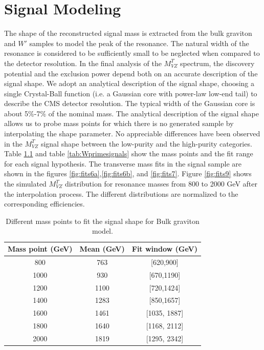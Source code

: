 \chapter{Signal Modeling}\label{sig_model}

The shape of the reconstructed signal mass is extracted from the bulk graviton and $W'$ samples to model the peak of the resonance. The natural width of the resonance is considered to be  sufficiently small to be neglected when compared to the detector resolution. In the final analysis of the $M_{VZ}^{T}$ spectrum, the discovery potential and the exclusion power depend both on an accurate description of the signal shape. We adopt an analytical description of the signal shape, choosing a single Crystal-Ball function (i.e. a Gaussian
core with power-law low-end tail) to describe the CMS detector resolution. The typical
width of the Gaussian core is about 5$\%$-7$\%$ of the nominal mass. The analytical description
of the signal shape allows us to probe mass points for which there is no generated sample by
interpolating the shape parameter. No appreciable differences have been observed
in the $M_{VZ}^{T}$ signal shape between the low-purity and the high-purity categories.
Table \ref{tab:Bulksignal} and table \ref{tab:Wprimesignals} show the mass points and the fit range for each signal hypothesis. The transverse mass fits in the signal sample are shown in the figures \ref{fig:fits6a},\ref{fig:fits6b}, and \ref{fig:fits7}. Figure \ref{fig:fits9} shows the simulated $M_{VZ}^{T}$ distribution for resonance masses from 800 to 2000 GeV after the interpolation process. The different distributions are normalized to the corresponding efficiencies.

\begin{table}[h]
\begin{center}
\caption{Different mass points to fit the signal shape for Bulk graviton model.}
\label{tab:Bulksignal}
\begin{tabular}{ccc} \hline
Mass point (GeV) & Mean (GeV) &  Fit window (GeV) \\ \hline
800 & 763 & [620,900] \\
1000 & 930 & [670,1190] \\
1200 & 1100 & [720,1424] \\
1400 & 1283 & [850,1657] \\
1600 & 1461 & [1035, 1887] \\
1800 & 1640 & [1168, 2112] \\
2000 & 1819 & [1295, 2342]
\end{tabular}
\end{center}
\end{table}

